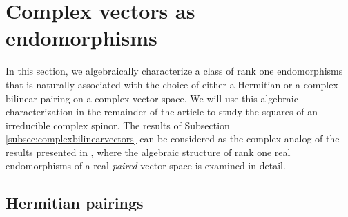 \documentclass[10pt,a4paper,twoside,reqno]{amsart}
\theoremstyle{plain}
\theoremstyle{definition}
\theoremstyle{remark}
\begin{document}
\begin{center}
\end{center}


\section{Complex vectors as endomorphisms}
\label{sec:vectorsasendos}


In this section, we algebraically characterize a class of rank one endomorphisms that is naturally associated with the choice of either a Hermitian or a complex-bilinear pairing on a complex vector space. We will use this algebraic characterization in the remainder of the article to study the squares of an irreducible complex spinor. The results of Subsection \ref{subsec:complexbilinearvectors} can be considered as the complex analog of the results presented in \cite[Section 2]{CLS21}, where the algebraic structure of rank one real endomorphisms of a real \emph{paired} vector space is examined in detail. 


\subsection{Hermitian pairings}

\end{document}
